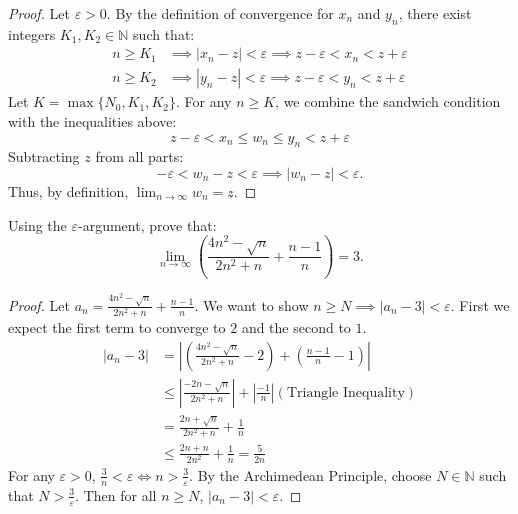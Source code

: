 \documentclass[
	UTF-8,
	11pt, %
	a4paper, %
]{LegrandOrangeBook}
\begin{document}
    \begin{proof}
    Let $\varepsilon > 0$. By the definition of convergence for $x_n$ and $y_n$, there exist integers $K_1, K_2 \in \mathbb{N}$ such that:
    \begin{align*}
        n \ge K_1 &\implies |x_n - z| < \varepsilon \implies z - \varepsilon < x_n < z + \varepsilon \\
        n \ge K_2 &\implies |y_n - z| < \varepsilon \implies z - \varepsilon < y_n < z + \varepsilon
    \end{align*}
    Let $K = \max\{N_0, K_1, K_2\}$. For any $n \ge K$, we combine the sandwich condition with the inequalities above:
    \[ z - \varepsilon < x_n \le w_n \le y_n < z + \varepsilon \]
    Subtracting $z$ from all parts:
    \[ -\varepsilon < w_n - z < \varepsilon \implies |w_n - z| < \varepsilon. \]
    Thus, by definition, $\lim_{n \to \infty} w_n = z$.
    \end{proof}

    \begin{example}
    Using the $\varepsilon$-argument, prove that:
    \[ \lim_{n \to \infty} \left( \frac{4n^2 - \sqrt{n}}{2n^2 + n} + \frac{n-1}{n} \right) = 3. \]

    \begin{proof}
            Let $a_n = \frac{4n^2 - \sqrt{n}}{2n^2 + n} + \frac{n-1}{n}$. 
        We want to show $n\geq N \implies |a_n - 3| < \varepsilon$.
        First we expect the first term to converge to $2$ and the second to $1$. 
        \begin{align*}
            \left| a_n - 3 \right| &= \left| \left(\frac{4n^2 - \sqrt{n}}{2n^2 + n} - 2\right) + \left(\frac{n-1}{n} - 1\right) \right| \\
            &\leq \left| \frac{-2n - \sqrt{n}}{2n^2 + n} \right| + \left| \frac{-1}{n} \right| (\text{Triangle Inequality}) \\
            &= \frac{2n + \sqrt{n}}{2n^2 + n} + \frac{1}{n}\\
            &\leq \frac{2n + n}{2n^2}+ \frac{1}{n} = \frac{5}{2n}
        \end{align*}
        For any $\varepsilon > 0$, $\frac{3}{n} < \varepsilon \iff n > \frac{3}{\varepsilon}$.
        By the Archimedean Principle, choose $N \in \mathbb{N}$ such that $N > \frac{3}{\varepsilon}$. Then for all $n \ge N$, $|a_n - 3| < \varepsilon$.
    \end{proof} 
    \end{example}
\end{document}
